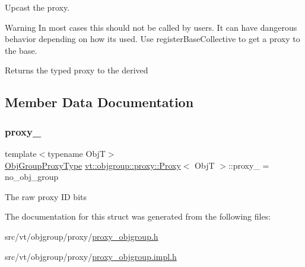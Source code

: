 Upcast the proxy. 

\begin{DoxyWarning}{Warning}
In most cases this should not be called by users. It can have dangerous behavior depending on how its used. Use {\ttfamily register\+Base\+Collective} to get a proxy to the base.
\end{DoxyWarning}
\begin{DoxyReturn}{Returns}
the typed proxy to the derived 
\end{DoxyReturn}


\subsection{Member Data Documentation}
\mbox{\label{structvt_1_1objgroup_1_1proxy_1_1_proxy_a4411a5c2a4719d264060041fd15d9d03}} 
\subsubsection{\texorpdfstring{proxy\+\_\+}{proxy\_}}
{\footnotesize\ttfamily template$<$typename ObjT$>$ \\
\hyperlink{namespacevt_ad7cae989df485fccca57f0792a880a8e}{Obj\+Group\+Proxy\+Type} \hyperlink{structvt_1_1objgroup_1_1proxy_1_1_proxy}{vt\+::objgroup\+::proxy\+::\+Proxy}$<$ ObjT $>$\+::proxy\+\_\+ = no\+\_\+obj\+\_\+group\hspace{0.3cm}{\ttfamily [private]}}

The raw proxy ID bits 

The documentation for this struct was generated from the following files\+:\begin{DoxyCompactItemize}
\item 
src/vt/objgroup/proxy/\hyperlink{proxy__objgroup_8h}{proxy\+\_\+objgroup.\+h}\item 
src/vt/objgroup/proxy/\hyperlink{proxy__objgroup_8impl_8h}{proxy\+\_\+objgroup.\+impl.\+h}\end{DoxyCompactItemize}

